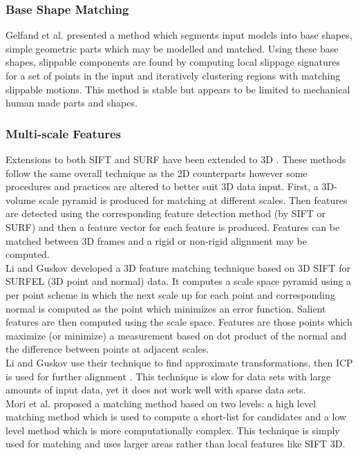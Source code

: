 \subsubsection{Base Shape Matching}

Gelfand et al. \cite{Gelfand04Shape} presented a method which segments input models into base shapes, simple geometric parts which may be modelled and matched. Using these base shapes, slippable components are found by computing local slippage signatures for a set of points in the input and iteratively clustering regions with matching slippable motions. This method is stable but appears to be limited to mechanical human made parts and shapes.

\subsubsection{Multi-scale Features}

Extensions to both SIFT and SURF have been extended to 3D \cite{Scovanner073Dimensional,Flitton10Object}. These methods follow the same overall technique as the 2D counterparts however some procedures and practices are altered to better suit 3D data input. First, a 3D-volume scale pyramid is produced for matching at different scales. Then features are detected using the corresponding feature detection method (by SIFT or SURF) and then a feature vector for each feature is produced. Features can be matched between 3D frames and a rigid or non-rigid alignment may be computed. \\

Li and Guskov \cite{Li05Multiscale} developed a 3D feature matching technique based on 3D SIFT for SURFEL (3D point and normal) data. It computes a scale space pyramid using a per point scheme in which the next scale up for each point and corresponding normal is computed as the point which minimizes an error function. Salient features are then computed using the scale space. Features are those points which maximize (or minimize) a measurement based on dot product of the normal and the difference between points at adjacent scales. \\

Li and Guskov use their technique to find approximate transformations, then ICP is used for further alignment \cite{Besl92Method,Chen92Object}. This technique is slow for data sets with large amounts of input data, yet it does not work well with sparse data sets. \\

	
Mori et al. \cite{Mori05Efficient} proposed a matching method based on two levels: a high level matching method which is used to compute a short-list for candidates and a low level method which is more computationally complex. This technique is simply used for matching and uses larger areas rather than local features like SIFT 3D. \\

